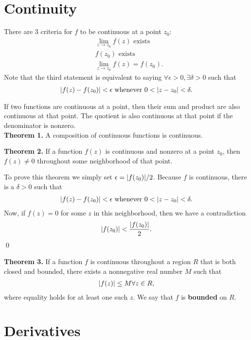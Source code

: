 \documentclass{book}
\theoremstyle{definition}
\newcommand{\f}[2]{\frac{#1}{#2}}
\begin{document}
\section{Continuity}

There are 3 criteria for $f$ to be continuous at a point $z_0$:
\begin{align}
&\lim_{z\to z_0} f(z) \text{ exists}\\
&f(z_0) \text{ exists}\\
&\lim_{z\to z_0} f(z) = f(z_0).
\end{align}
Note that the third statement is equivalent to saying $\forall \epsilon > 0, \exists \delta > 0$ such that
\begin{align}
\abs{f(z) - f(z_0)} < \epsilon \text{ whenever } 0 < \abs{z - z_0} < \delta.
\end{align}

If two functions are continuous at a point, then their sum and product are also continuous at that point. The quotient is also continuous at that point if the denominator is nonzero. \\


\noindent \textbf{Theorem 1.} A composition of continuous functions is continuous. 

\noindent \textbf{Theorem 2.} If a function $f(z)$ is continuous and nonzero at a point $z_0$, then $f(z) \neq 0$ throughout some neighborhood of that point. 

To prove this theorem we simply set $\epsilon = \abs{f(z_0)} / 2$. Because $f$ is continuous, there is a $\delta > 0$ such that 
\begin{align}
\abs{f(z) - f(z_0)} < \epsilon \text{ whenever } 0 < \abs{z - z_0} < \delta.
\end{align}
Now, if $f(z) = 0$ for some $z$ in this neighborhood, then we have a contradiction
\begin{align}
\abs{f(z_0)} < \f{\abs{f(z_0)}}{2}.
\end{align}
\qed


\noindent \textbf{Theorem 3.} If a function $f$ is continuous throughout a region $R$ that is both closed and bounded, there exists a nonnegative real number $M$ such that
\begin{align}
\abs{f(z)} \leq M \forall z \in R,
\end{align}
where equality holds for at least one such $z$. We say that $f$ is \textbf{bounded} on $R$. 




\section{Derivatives}
\end{document}
